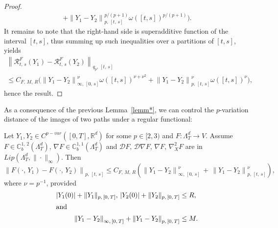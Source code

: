 \documentclass[10pt]{amsart}
\theoremstyle{definition}\newtheorem{defi}[theo]{Definition}\newtheorem{rema}[theo]{Remark}\newtheorem{exam}[theo]{Example}\newtheorem{exem}[theo]{Example}\newtheorem{nota}[theo]{Notation}
\newcommand{\bbC}{\mathbb{C}}
\newcommand{\calD}{\mathcal{D}}
\newcommand{\calR}{\mathcal{R}}
\newcommand{\Rr}{{\mathbb{R}}}
\begin{document}
\begin{proof}
\begin{multline*}
+\left\|Y_1-Y_2\right\|_{p,\,[t,\,s]}^{p/(p+1)} \omega([t,s])^{p/(p+1)} \Big).
\end{multline*}
It remains to note that the right-hand side is superadditive function of the interval $[t,s]$, thus summing up such inequalities over a partitions of $[t,s]$, yields
\begin{multline*}
\left\|\calR^{F}_{t,\,s}(Y_1)-\calR^{F}_{t,\,s}(Y_2)\right\|_{q_p,\,[t,\,s]}\\
\leq C_{F,\,M,\,R}\Big(\left\|Y_1-Y_2\right\|^{\nu}_{\infty,\,[0,\,s]} \omega([t,s])^{\nu+\nu^2}
+\left\|Y_1-Y_2\right\|_{p,\,[t,\,s]}^{\nu} \omega([t,s])^{\nu} \Big),
\end{multline*}
hence the result.
\end{proof}

As a consequence of the previous Lemma~\ref{lemm*}, we can control the $p$-variation distance of the images of two paths under a regular functional:

\begin{coro}\label{chp3Cor:controlcont}
Let $Y_1, Y_2\in C^{p-var}([0,T],\Rr^d)$ for some $p\in [2,3)$ and $F\colon \Lambda^d_T\to V$. Assume $ F\in \bbC^{1,\,2}_b(\Lambda^d_T),\, \nabla F\in \bbC^{1,1}_b(\Lambda^d_T)$ and $\calD F,\, \calD\nabla F,\, \nabla F,\, \nabla^2_{X} F$ are in $Lip(\Lambda^d_T, \|\cdot\|_{\infty})$. Then
\[
\left\|F(\cdot,\,Y_1)-F(\cdot,\,Y_2)\right\|_{p,\, [t,\,s]}\leq C_{F,\,M,\,R}\left(\left\|Y_1-Y_2\right\|_{\infty,\,[0,\,s]}^{\nu}\,+\,\left\|Y_1-Y_2\right\|_{p,\,[t,\,s]}^{\nu}\right),
\]
where $\nu=p^{-1}$, provided
\begin{align*}
\left|Y_1(0)\right|+\|Y_1\|_{p,\,[0,\,T]},\,\left|Y_2(0)\right|+\|Y_2\|_{p,\,[0,\,T]}&\leq R,
\\
\intertext{and}
\left\|Y_1-Y_2\right\|_{\infty,\,[0,\,T]}+\left\|Y_1-Y_2\right\|_{p,\,[0,\,T]}&\leq M.
\end{align*}
\end{coro}
\end{document}
